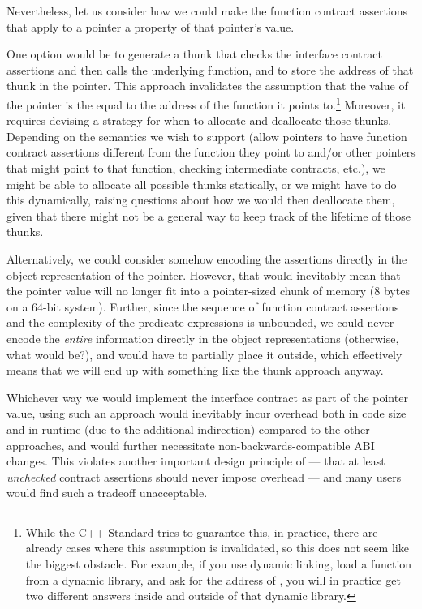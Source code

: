 Nevertheless, let us consider how we could make the function contract assertions that apply to a pointer a property of that pointer's value.

One option would be to generate a thunk that checks the interface contract assertions and then calls the underlying function, and to store the address of that thunk in the pointer. This approach  invalidates the assumption that the value of the pointer is the equal to the address of the function it points to.\footnote{While the C++ Standard tries to guarantee this, in practice, there are already cases where this assumption is invalidated, so this does not seem like the biggest obstacle. For example, if you use dynamic linking, load a function  from a dynamic library, and ask for the address of , you will in practice get two different answers inside and outside of that dynamic library.} Moreover, it requires devising a strategy for when to allocate and deallocate those thunks. Depending on the semantics we wish to support (allow pointers to have function contract assertions different from the function they point to and/or other pointers that might point to that function, checking intermediate contracts, etc.), we might be able to allocate all possible thunks statically, or we might have to do this dynamically, raising questions about how we would then deallocate them, given that there might not be a general way to keep track of the lifetime of those thunks.

Alternatively, we could consider somehow encoding the assertions directly in the object representation of the pointer. However, that would inevitably mean that the pointer value will no longer fit into a pointer-sized chunk of memory (8 bytes on a 64-bit system). Further, since the sequence of function contract assertions and the complexity of the predicate expressions is unbounded, we could never encode the \emph{entire} information directly in the object representations (otherwise, what would  be?), and would have to partially place it outside, which effectively means that we will end up with something like the thunk approach anyway.

Whichever way we would implement the interface contract as part of the pointer value, using such an approach would inevitably incur overhead both in code size and in runtime (due to the additional indirection) compared to the other approaches, and would further necessitate non-backwards-compatible ABI changes. This violates another important design principle of \cite{P2900R7} --- that at least \emph{unchecked} contract assertions should never impose overhead --- and many users would find such a tradeoff unacceptable.

